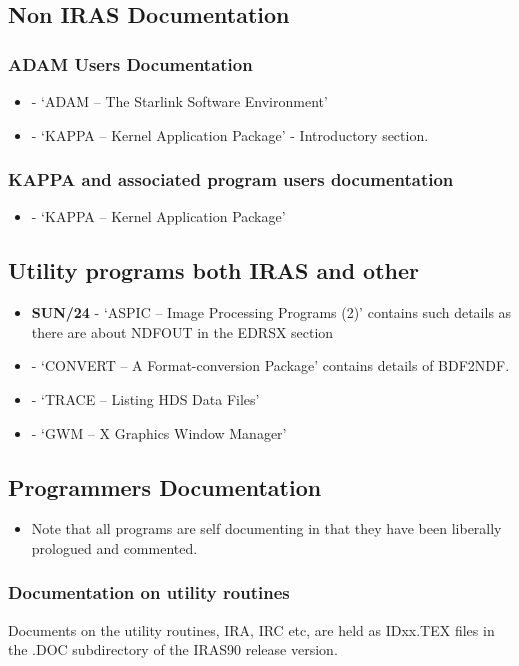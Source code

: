 \subsection{Non IRAS Documentation}
\subsubsection{ADAM Users Documentation}
\begin{itemize}
\item {\bf {}} - `ADAM -- The Starlink Software Environment' 
\item {\bf {}} - `KAPPA -- Kernel Application
Package' - Introductory section. 
\end{itemize}
\subsubsection{KAPPA and associated program users documentation}
\begin{itemize}
\item {\bf {}} - `KAPPA -- Kernel Application Package' 
\end{itemize}
\subsection{Utility programs both IRAS and other}
\begin{itemize}
\item {\bf SUN/24} - `ASPIC -- Image Processing Programs (2)' contains such
details as there are about NDFOUT in the EDRSX section
\item {\bf {}} - `CONVERT -- A Format-conversion Package' 
contains details of BDF2NDF.
\item {\bf {}} - `TRACE -- Listing HDS Data Files'
\item {\bf {}} - `GWM -- X Graphics Window Manager'
\end{itemize}

\subsection{Programmers Documentation}
\begin{itemize}
\item Note that all programs are self documenting in that they have been 
liberally prologued and commented.
\end{itemize}
\subsubsection{Documentation on utility routines}
Documents on the utility routines, IRA, IRC etc, are held as IDxx.TEX files
in the .DOC subdirectory of the IRAS90 release version. 

